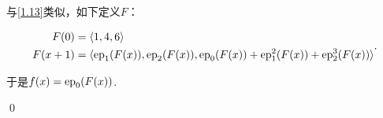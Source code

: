 \begin{pf} \rm 

与\ref{1.13}类似，如下定义$F$：

$$
\begin{aligned}
    F(0)&=\langle 1,4,6\rangle \\
    F(x+1)&=\langle \mathrm{ep}_1(F(x)),\mathrm{ep}_2(F(x)), 
    \mathrm{ep}_0(F(x)) + \mathrm{ep}_1^2(F(x)) + \mathrm{ep}_2^3(F(x)) \rangle\\
\end{aligned}.
$$

于是$f(x)=\mathrm{ep}_0(F(x))$. 

\qed
\end{pf}

